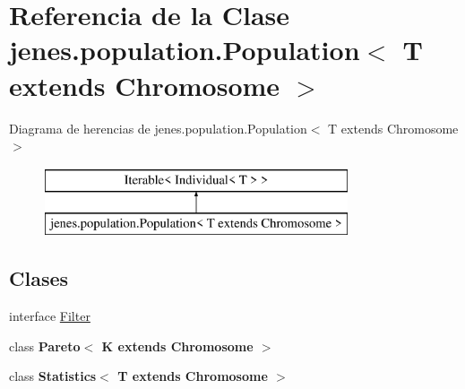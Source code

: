 \hypertarget{classjenes_1_1population_1_1_population_3_01_t_01extends_01_chromosome_01_4}{\section{Referencia de la Clase jenes.\-population.\-Population$<$ T extends Chromosome $>$}
\label{classjenes_1_1population_1_1_population_3_01_t_01extends_01_chromosome_01_4}
}
Diagrama de herencias de jenes.\-population.\-Population$<$ T extends Chromosome $>$\begin{figure}[H]
\begin{center}
\leavevmode
\includegraphics[height=2.000000cm]{classjenes_1_1population_1_1_population_3_01_t_01extends_01_chromosome_01_4}
\end{center}
\end{figure}
\subsection*{Clases}
\begin{DoxyCompactItemize}
\item 
interface \hyperlink{interfacejenes_1_1population_1_1_population_3_01_t_01extends_01_chromosome_01_4_1_1_filter}{Filter}
\item 
class {\bfseries Pareto$<$ K extends Chromosome $>$}
\item 
class {\bfseries Statistics$<$ T extends Chromosome $>$}
\end{DoxyCompactItemize}
